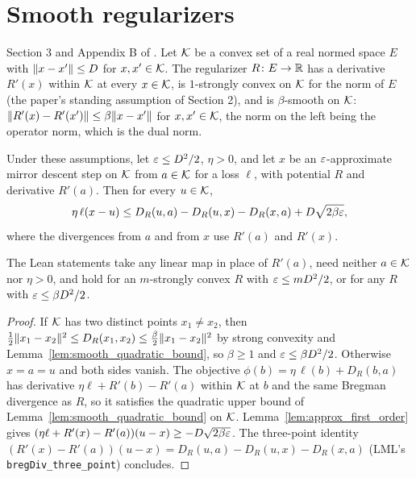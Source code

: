 \chapter{Smooth regularizers}
\label{chap:smooth}

Section 3 and Appendix B of \cite{SSKM26}. Let $\mathcal{K}$ be a convex set of a real normed space $E$
with $\lVert x - x' \rVert \le D$ for $x, x' \in \mathcal{K}$. The regularizer $R \colon E \to \mathbb{R}$ has a
derivative $R'(x)$ within $\mathcal{K}$ at every $x \in \mathcal{K}$, is $1$-strongly convex on $\mathcal{K}$ for the norm
of $E$ (the paper's standing assumption of Section 2), and is $\beta$-smooth on $\mathcal{K}$:
$\lVert R'(x) - R'(x') \rVert \le \beta \lVert x - x' \rVert$ for $x, x' \in \mathcal{K}$, the norm on the left being the
operator norm, which is the dual norm.

\begin{lemma}
  \label{lem:smooth_one_step}
  \leanok
  Under these assumptions, let $\varepsilon \le D^2/2$, $\eta > 0$, and let $x$ be an $\varepsilon$-approximate
  mirror descent step on $\mathcal{K}$ from $a \in \mathcal{K}$ for a loss $\ell$, with potential $R$ and
  derivative $R'(a)$. Then for every $u \in \mathcal{K}$,
  \[ \eta\, \ell(x - u) \le D_R(u, a) - D_R(u, x) - D_R(x, a) + D \sqrt{2 \beta \varepsilon}, \]
  where the divergences from $a$ and from $x$ use $R'(a)$ and $R'(x)$.

  The Lean statements take any linear map in place of $R'(a)$, need neither $a \in \mathcal{K}$ nor
  $\eta > 0$, and hold for an $m$-strongly convex $R$ with $\varepsilon \le m D^2 / 2$, or for any $R$
  with $\varepsilon \le \beta D^2 / 2$.
\end{lemma}

\begin{proof}
  \leanok
  If $\mathcal{K}$ has two distinct points $x_1 \ne x_2$, then
  $\frac12 \lVert x_1 - x_2 \rVert^2 \le D_R(x_1, x_2) \le \frac\beta2 \lVert x_1 - x_2 \rVert^2$ by strong
  convexity and Lemma~\ref{lem:smooth_quadratic_bound}, so $\beta \ge 1$ and $\varepsilon \le \beta D^2 /
  2$. Otherwise $x = a = u$ and both sides vanish. The objective $\phi(b) = \eta\,\ell(b) + D_R(b,
  a)$ has derivative $\eta \ell + R'(b) - R'(a)$ within $\mathcal{K}$ at $b$ and the same Bregman
  divergence as $R$, so it satisfies the quadratic upper bound of
  Lemma~\ref{lem:smooth_quadratic_bound} on $\mathcal{K}$. Lemma~\ref{lem:approx_first_order} gives
  $(\eta \ell + R'(x) - R'(a))(u - x) \ge -D\sqrt{2 \beta \varepsilon}$. The three-point identity
  $(R'(x) - R'(a))(u - x) = D_R(u, a) - D_R(u, x) - D_R(x, a)$ (LML's
  \texttt{bregDiv\_three\_point}) concludes.
\end{proof}

